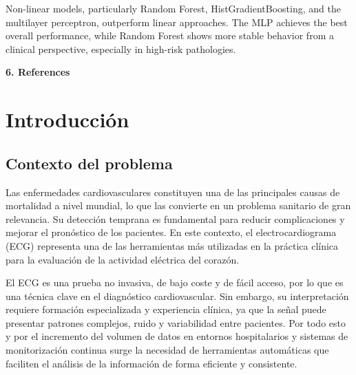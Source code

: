 \documentclass[12pt,a4paper,twoside]{book}
\begin{document}
Non-linear models, particularly Random Forest, HistGradientBoosting, and the multilayer perceptron, outperform linear approaches. 
The MLP achieves the best overall performance, while Random Forest shows more stable behavior from a clinical perspective, especially in high-risk pathologies.
\vspace{0.5cm}

\noindent \large \textbf{6. References}
\vspace{0.3cm}

\begin{refsection}

\nocite{ptbxl_dataset,hannun2019arrhythmia,ayano2022ecg_ml_review,kalmady2024ecg_cv,esc_ai_ecg_diagnostics}

\printbibliography[heading=none]
\end{refsection}

\newpage

\tableofcontents
\newpage

\listoffigures
\newpage

\listoftables
\newpage


\chapter{Introducción}

\section{Contexto del problema}

Las enfermedades cardiovasculares constituyen una de las principales causas de mortalidad a nivel mundial, lo que las convierte en un problema sanitario de gran relevancia. 
Su detección temprana es fundamental para reducir complicaciones y mejorar el pronóstico de los pacientes. 
En este contexto, el electrocardiograma (ECG) representa una de las herramientas más utilizadas en la práctica clínica para la evaluación de la actividad eléctrica del corazón.

El ECG es una prueba no invasiva, de bajo coste y de fácil acceso, por lo que es una técnica clave en el diagnóstico cardiovascular. 
Sin embargo, su interpretación requiere formación especializada y experiencia clínica, ya que la señal puede presentar patrones complejos, ruido y variabilidad entre pacientes. 
Por todo esto y por el incremento del volumen de datos en entornos hospitalarios y sistemas de monitorización continua surge la necesidad de herramientas automáticas que faciliten el análisis de la información de forma eficiente y consistente.
\end{document}

